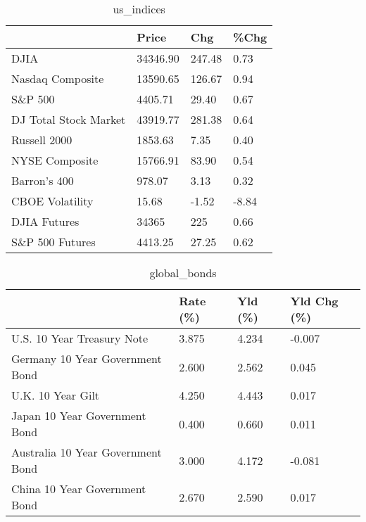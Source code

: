 \documentclass{article}%
\begin{document}
%


\begin{table}[htbp]%
\caption{us\_indices}%
\centering%
\begin{adjustbox}{width=1\textwidth}%
\begin{tabular}{llll}
\toprule
                      &    Price &    Chg &  \%Chg \\
\midrule
                 DJIA & 34346.90 & 247.48 &  0.73 \\
     Nasdaq Composite & 13590.65 & 126.67 &  0.94 \\
              S\&P 500 &  4405.71 &  29.40 &  0.67 \\
DJ Total Stock Market & 43919.77 & 281.38 &  0.64 \\
         Russell 2000 &  1853.63 &   7.35 &  0.40 \\
       NYSE Composite & 15766.91 &  83.90 &  0.54 \\
         Barron's 400 &   978.07 &   3.13 &  0.32 \\
      CBOE Volatility &    15.68 &  -1.52 & -8.84 \\
         DJIA Futures &    34365 &    225 &  0.66 \\
      S\&P 500 Futures &  4413.25 &  27.25 &  0.62 \\
\bottomrule
\end{tabular}
%
\end{adjustbox}%
\end{table}

%


\begin{table}[htbp]%
\caption{global\_bonds}%
\centering%
\begin{adjustbox}{width=1\textwidth}%
\begin{tabular}{llll}
\toprule
                                  & Rate (\%) & Yld (\%) & Yld Chg (\%) \\
\midrule
       U.S. 10 Year Treasury Note &    3.875 &   4.234 &      -0.007 \\
  Germany 10 Year Government Bond &    2.600 &   2.562 &       0.045 \\
                U.K. 10 Year Gilt &    4.250 &   4.443 &       0.017 \\
    Japan 10 Year Government Bond &    0.400 &   0.660 &       0.011 \\
Australia 10 Year Government Bond &    3.000 &   4.172 &      -0.081 \\
    China 10 Year Government Bond &    2.670 &   2.590 &       0.017 \\
\bottomrule
\end{tabular}
%
\end{adjustbox}%
\end{table}
\end{document}
